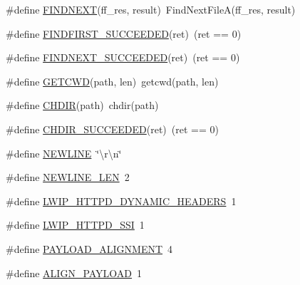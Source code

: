 \begin{DoxyCompactItemize}
\item 
\#define \hyperlink{openmote-cc2538_2lwip_2src_2apps_2httpd_2makefsdata_2makefsdata_8c_a33515e2020161f0e3c67b3daff9e8e70}{F\+I\+N\+D\+N\+E\+XT}(ff\+\_\+res,  result)~Find\+Next\+FileA(ff\+\_\+res, result)
\item 
\#define \hyperlink{openmote-cc2538_2lwip_2src_2apps_2httpd_2makefsdata_2makefsdata_8c_a99bd6347f90570a312fddf01c80c4203}{F\+I\+N\+D\+F\+I\+R\+S\+T\+\_\+\+S\+U\+C\+C\+E\+E\+D\+ED}(ret)~(ret == 0)
\item 
\#define \hyperlink{openmote-cc2538_2lwip_2src_2apps_2httpd_2makefsdata_2makefsdata_8c_a1f01258f762bd46a73cbbadd7718650e}{F\+I\+N\+D\+N\+E\+X\+T\+\_\+\+S\+U\+C\+C\+E\+E\+D\+ED}(ret)~(ret == 0)
\item 
\#define \hyperlink{openmote-cc2538_2lwip_2src_2apps_2httpd_2makefsdata_2makefsdata_8c_a2f45398870a9a2000b09f7cb5953cb34}{G\+E\+T\+C\+WD}(path,  len)~getcwd(path, len)
\item 
\#define \hyperlink{openmote-cc2538_2lwip_2src_2apps_2httpd_2makefsdata_2makefsdata_8c_a61cb8a4a99cf0857f4f634add3a10c94}{C\+H\+D\+IR}(path)~chdir(path)
\item 
\#define \hyperlink{openmote-cc2538_2lwip_2src_2apps_2httpd_2makefsdata_2makefsdata_8c_a5db5cead396d33a048b93e63b611fb6c}{C\+H\+D\+I\+R\+\_\+\+S\+U\+C\+C\+E\+E\+D\+ED}(ret)~(ret == 0)
\item 
\#define \hyperlink{openmote-cc2538_2lwip_2src_2apps_2httpd_2makefsdata_2makefsdata_8c_a806511f4930171733227c99101dc0606}{N\+E\+W\+L\+I\+NE}~\char`\"{}\textbackslash{}r\textbackslash{}n\char`\"{}
\item 
\#define \hyperlink{openmote-cc2538_2lwip_2src_2apps_2httpd_2makefsdata_2makefsdata_8c_ad5eda0710da3e422c27ad1d406a015d1}{N\+E\+W\+L\+I\+N\+E\+\_\+\+L\+EN}~2
\item 
\#define \hyperlink{openmote-cc2538_2lwip_2src_2apps_2httpd_2makefsdata_2makefsdata_8c_a75932fc5eeb9abeddfdaf8413574c6d7}{L\+W\+I\+P\+\_\+\+H\+T\+T\+P\+D\+\_\+\+D\+Y\+N\+A\+M\+I\+C\+\_\+\+H\+E\+A\+D\+E\+RS}~1
\item 
\#define \hyperlink{openmote-cc2538_2lwip_2src_2apps_2httpd_2makefsdata_2makefsdata_8c_acb70e0cdd30a940f8bce681c6cc63949}{L\+W\+I\+P\+\_\+\+H\+T\+T\+P\+D\+\_\+\+S\+SI}~1
\item 
\#define \hyperlink{openmote-cc2538_2lwip_2src_2apps_2httpd_2makefsdata_2makefsdata_8c_a9f6c5880fb0c20de162f0908943e8e22}{P\+A\+Y\+L\+O\+A\+D\+\_\+\+A\+L\+I\+G\+N\+M\+E\+NT}~4
\item 
\#define \hyperlink{openmote-cc2538_2lwip_2src_2apps_2httpd_2makefsdata_2makefsdata_8c_a49095bb77ea27d3ce2ad9eb687e01bb0}{A\+L\+I\+G\+N\+\_\+\+P\+A\+Y\+L\+O\+AD}~1

\end{DoxyCompactItemize}
